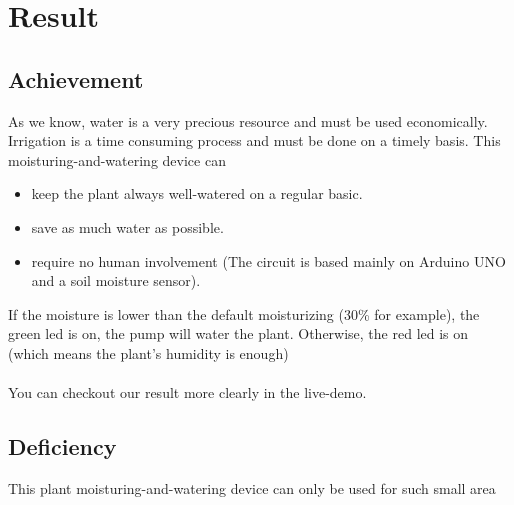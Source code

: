 \documentclass[12pt]{article}
\begin{document}
    \section{Result}
        \subsection{Achievement}
            As we know, water is a very precious resource and must be used economically. Irrigation is a time consuming process and must be done on a timely basis. This moisturing-and-watering device can
            \begin{itemize}
                \item keep the plant always well-watered on a regular basic.
                \item save as much water as possible.
                \item require no human involvement (The circuit is based mainly on Arduino UNO and a soil moisture sensor).
            \end{itemize}     
         If the moisture is lower than the default moisturizing (30\% for example), the green led is on, the pump will water the plant. Otherwise, the red led is on (which means the plant's humidity is enough) \\  \\  
         You can checkout our result more clearly in the live-demo.
        \subsection{Deficiency}
            This plant moisturing-and-watering device can only be used for such small area
\end{document}
